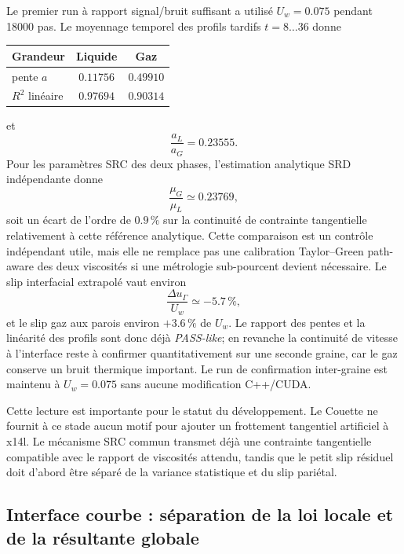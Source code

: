 \documentclass[11pt,a4paper]{article}
\begin{document}
Le premier run à rapport signal/bruit suffisant a utilisé $U_w=0.075$ pendant 18000 pas. Le moyennage temporel des profils tardifs $t=8\ldots36$ donne
\begin{center}
\begin{tabular}{lcc}
\toprule
Grandeur & Liquide & Gaz\\
\midrule
pente $a$ & $0.11756$ & $0.49910$\\
$R^2$ linéaire & $0.97694$ & $0.90314$\\
\bottomrule
\end{tabular}
\end{center}
et
\begin{equation}
  \frac{a_L}{a_G}=0.23555.
\end{equation}
Pour les paramètres SRC des deux phases, l'estimation analytique SRD indépendante donne
\begin{equation}
  \frac{\mu_G}{\mu_L}\simeq0.23769,
\end{equation}
soit un écart de l'ordre de $0.9\,\%$ sur la continuité de contrainte tangentielle relativement à cette référence analytique. Cette comparaison est un contrôle indépendant utile, mais elle ne remplace pas une calibration Taylor--Green path-aware des deux viscosités si une métrologie sub-pourcent devient nécessaire. Le slip interfacial extrapolé vaut environ
\begin{equation}
  \frac{\Delta u_\Gamma}{U_w}\simeq-5.7\,\%,
\end{equation}
et le slip gaz aux parois environ $+3.6\,\%$ de $U_w$. Le rapport des pentes et la linéarité des profils sont donc déjà \emph{PASS-like}; en revanche la continuité de vitesse à l'interface reste à confirmer quantitativement sur une seconde graine, car le gaz conserve un bruit thermique important. Le run de confirmation inter-graine est maintenu à $U_w=0.075$ sans aucune modification C++/CUDA.

Cette lecture est importante pour le statut du développement. Le Couette ne fournit à ce stade aucun motif pour ajouter un frottement tangentiel artificiel à x14l. Le mécanisme SRC commun transmet déjà une contrainte tangentielle compatible avec le rapport de viscosités attendu, tandis que le petit slip résiduel doit d'abord être séparé de la variance statistique et du slip pariétal.


\subsection{Interface courbe : séparation de la loi locale et de la résultante globale}
\end{document}
